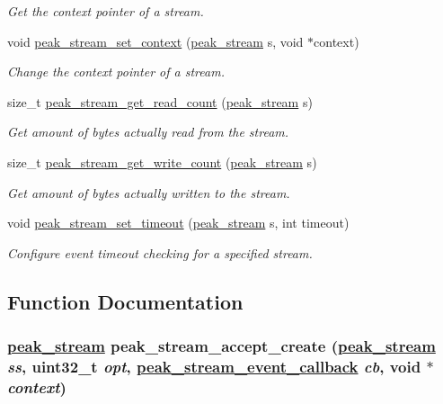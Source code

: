 \begin{CompactItemize}
\begin{CompactList}\small\item\em Get the context pointer of a stream. \item\end{CompactList}\item 
void \hyperlink{group__stream__common_ga10}{peak\_\-stream\_\-set\_\-context} (\hyperlink{group__stream_ga0}{peak\_\-stream} s, void $\ast$context)
\begin{CompactList}\small\item\em Change the context pointer of a stream. \item\end{CompactList}\item 
size\_\-t \hyperlink{group__stream__common_ga11}{peak\_\-stream\_\-get\_\-read\_\-count} (\hyperlink{group__stream_ga0}{peak\_\-stream} s)
\begin{CompactList}\small\item\em Get amount of bytes actually read from the stream. \item\end{CompactList}\item 
size\_\-t \hyperlink{group__stream__common_ga12}{peak\_\-stream\_\-get\_\-write\_\-count} (\hyperlink{group__stream_ga0}{peak\_\-stream} s)
\begin{CompactList}\small\item\em Get amount of bytes actually written to the stream. \item\end{CompactList}\item 
void \hyperlink{group__stream__common_ga13}{peak\_\-stream\_\-set\_\-timeout} (\hyperlink{group__stream_ga0}{peak\_\-stream} s, int timeout)
\begin{CompactList}\small\item\em Configure event timeout checking for a specified stream. \item\end{CompactList}\end{CompactItemize}


\subsection{Function Documentation}
\hypertarget{group__stream__common_ga1}{
\subsubsection[peak\_\-stream\_\-accept\_\-create]{\setlength{\rightskip}{0pt plus 5cm}\hyperlink{group__stream_ga0}{peak\_\-stream} peak\_\-stream\_\-accept\_\-create (\hyperlink{group__stream_ga0}{peak\_\-stream} {\em ss}, uint32\_\-t {\em opt}, \hyperlink{group__stream_ga1}{peak\_\-stream\_\-event\_\-callback} {\em cb}, void $\ast$ {\em context})}}
\label{group__stream__common_ga1}



